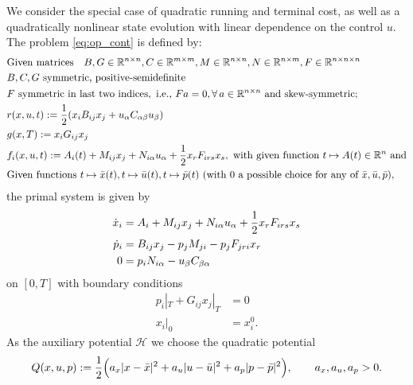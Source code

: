\documentclass[11pt]{article}
\begin{document}
We consider the special case of quadratic running and terminal cost, as well as a quadratically nonlinear state evolution with linear dependence on the control $u$. The problem \eqref{eq:op_cont} is defined by:
\begin{subequations}
\allowdisplaybreaks
\label{eq:QQR_def}
\begin{align}
& \mbox{Given matrices} \quad B, G \in \R^{n \times n},  C \in \R^{m \times m}, M \in \R^{n \times n}, N \in \R^{n \times m}, F \in \R^{n \times n \times n} \notag\\
& B,C,G \ \mbox{symmetric, positive-semidefinite} \notag\\
& F \ \mbox{symmetric in last two indices}, \mbox{ i.e., } F a = 0, \forall \, a \in \R^{n \times n} \ \mbox{and skew-symmetric;} \notag\\
    & r(x,u,t) := \half (x_i B_{ij} x_j + u_\alpha C_{\alpha \beta} u_\beta) \notag\\
    & g(x,T) := x_iG_{ij} x_j \notag\\
    & f_i(x,u,t) := A_i(t) + M_{ij} x_j + N_{i\alpha} u_\alpha + \half x_r F_{irs} x_s, \mbox{ with given function } t \mapsto A(t)  \in \R^n \mbox{ and} \notag\\
    & \mbox{Given functions} \ t\mapsto \bar{x}(t), t \mapsto \bar{u}(t), t\mapsto \bar{p}(t) \mbox{ (with 0 a possible choice for any of } \bar{x}, \bar{u}, \bar{p}), \notag
\end{align}
\end{subequations}
the primal system is given by
\begin{equation}
    \label{eq:primal_QQR}
    \begin{aligned}
        \dot{x}_i & = A_i + M_{ij} x_j + N_{i\alpha} u_\alpha + \frac{1}{2} x_r F_{irs} x_s \\
        \dot{p}_i & = B_{ij} x_j - p_j  M_{ji} - p_j F_{jri} x_r\\
        0 & = p_i N_{i \alpha} - u_\beta C_{\beta \alpha} 
    \end{aligned}
\end{equation}
on $[0,T]$ with boundary conditions
\begin{equation}
    \label{eq:primal_QQR_bc}
    \begin{aligned}
         p_i|_T + G_{ij} x_j|_T & = 0\\
    x_i|_0 & = x^0_i.
    \end{aligned}
\end{equation}
As the auxiliary potential $\mathcal{H}$ we choose the quadratic potential
\[
Q(x,u,p) := \frac{1}{2} \Big( a_x |x - \bar{x}|^2 + a_u |u - \bar{u}|^2 + a_p |p - \bar{p}|^2 \Big), \qquad a_x, a_u, a_p > 0.
\]
\end{document}
